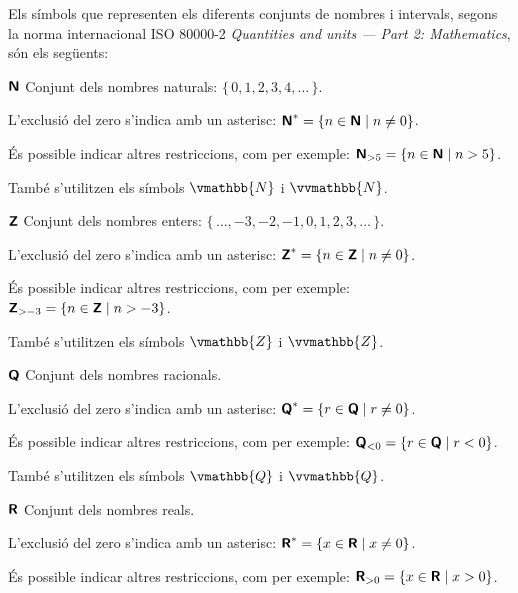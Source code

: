 \pagebreak

Els símbols que representen els diferents conjunts de nombres i intervals, segons la norma internacional ISO 80000-2 \textit{Quantities and units --- Part 2: Mathematics}, són els següents:

\begin{list}{}
{\setlength{\labelwidth}{15mm} \setlength{\leftmargin}{20mm}
\setlength{\labelsep}{5mm}}
	 \item[${\boldsymbol{\mathsf{N}}}$] Conjunt dels nombres naturals: $\{\,0,1,2,3,4,\ldots\,\}$. 
	 
	 L'exclusió del zero s'indica amb un asterisc: ${\boldsymbol{\mathsf{N}}}^* = \{ n \in {\ensuremath{\boldsymbol{\mathsf{N}}}} \mid n \ne 0 \}$. 
	 
	 És possible indicar altres restriccions, com per exemple:  ${\boldsymbol{\mathsf{N}}}_{> 5} = \{ n \in {\ensuremath{\boldsymbol{\mathsf{N}}}} \mid n > 5\}$. 
	 
	 També s'utilitzen els símbols $\vmathbb{N}$ i  $\vvmathbb{N}$.
	 
	 \item[${\boldsymbol{\mathsf{Z}}}$] Conjunt dels nombres enters: $\{\,\ldots,-3,-2,-1,0,1,2,3,\ldots\,\}$.  
	 
	 L'exclusió del zero s'indica amb un asterisc: ${\boldsymbol{\mathsf{Z}}}^* = \{ n \in {\ensuremath{\boldsymbol{\mathsf{Z}}}} \mid n \ne 0 \}$. 
	 
	 És possible indicar altres restriccions, com per exemple:  ${\boldsymbol{\mathsf{Z}}}_{> -3} = \{ n \in {\ensuremath{\boldsymbol{\mathsf{Z}}}} \mid n > -3\}$.     
	 
	 També s'utilitzen els símbols $\vmathbb{Z}$ i $\vvmathbb{Z}$.
    
	 \item[${\boldsymbol{\mathsf{Q}}}$] Conjunt dels nombres racionals. 
	 
	 L'exclusió del zero s'indica amb un asterisc: ${\boldsymbol{\mathsf{Q}}}^* = \{ r \in {\ensuremath{\boldsymbol{\mathsf{Q}}}} \mid r \ne 0 \}$. 
	 
	 És possible indicar altres restriccions, com per exemple:  ${\boldsymbol{\mathsf{Q}}}_{< 0} = \{ r \in {\ensuremath{\boldsymbol{\mathsf{Q}}}} \mid r < 0 \}$. 
	 
	 També s'utilitzen els símbols $\vmathbb{Q}$ i $\vvmathbb{Q}$.
	 
	 \item[${\boldsymbol{\mathsf{R}}}$] Conjunt dels nombres reals. 
	 
	 L'exclusió del zero s'indica amb un asterisc: ${\boldsymbol{\mathsf{R}}}^* = \{ x \in {\ensuremath{\boldsymbol{\mathsf{R}}}} \mid x \ne 0 \}$. 
	 
	 És possible indicar altres restriccions, com per exemple:  ${\boldsymbol{\mathsf{R}}}_{> 0} = \{ x \in {\ensuremath{\boldsymbol{\mathsf{R}}}} \mid x > 0 \}$. 
	 

\end{list}
